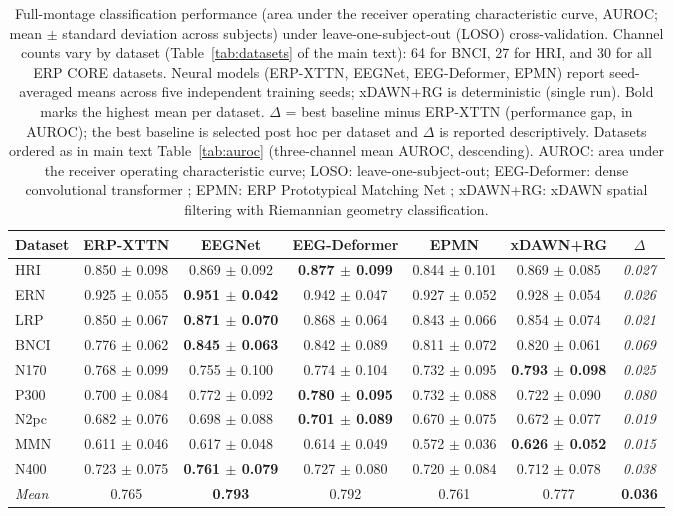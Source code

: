 \begin{table}[t]
\centering
\setlength{\tabcolsep}{5pt}
\caption{%
Full-montage classification performance (area under the receiver operating characteristic curve, AUROC; mean $\pm$ standard deviation across subjects) under leave-one-subject-out (LOSO) cross-validation. Channel counts vary by dataset (Table~\ref{tab:datasets} of the main text): 64 for BNCI, 27 for HRI, and 30 for all ERP CORE datasets. Neural models (ERP-XTTN, EEGNet, EEG-Deformer, EPMN) report seed-averaged means across five independent training seeds; xDAWN+RG is deterministic (single run). Bold marks the highest mean per dataset. $\Delta$ = best baseline minus ERP-XTTN (performance gap, in AUROC); the best baseline is selected post hoc per dataset and $\Delta$ is reported descriptively. Datasets ordered as in main text Table~\ref{tab:auroc} (three-channel mean AUROC, descending). AUROC: area under the receiver operating characteristic curve; LOSO: leave-one-subject-out; EEG-Deformer: dense convolutional transformer \cite{ding2024}; EPMN: ERP Prototypical Matching Net \cite{wei2022}; xDAWN+RG: xDAWN spatial filtering with Riemannian geometry classification.%
}
\label{sup:tab-fullmontage-auroc}
\begin{tabular}{lcccccc}
\toprule
Dataset & ERP-XTTN & EEGNet & EEG-Deformer & EPMN & xDAWN+RG & $\Delta$ \\
\midrule
HRI & 0.850 $\pm$ 0.098 & 0.869 $\pm$ 0.092 & \textbf{0.877 $\pm$ 0.099} & 0.844 $\pm$ 0.101 & 0.869 $\pm$ 0.085 & \textit{0.027} \\
ERN & 0.925 $\pm$ 0.055 & \textbf{0.951 $\pm$ 0.042} & 0.942 $\pm$ 0.047 & 0.927 $\pm$ 0.052 & 0.928 $\pm$ 0.054 & \textit{0.026} \\
LRP & 0.850 $\pm$ 0.067 & \textbf{0.871 $\pm$ 0.070} & 0.868 $\pm$ 0.064 & 0.843 $\pm$ 0.066 & 0.854 $\pm$ 0.074 & \textit{0.021} \\
BNCI & 0.776 $\pm$ 0.062 & \textbf{0.845 $\pm$ 0.063} & 0.842 $\pm$ 0.089 & 0.811 $\pm$ 0.072 & 0.820 $\pm$ 0.061 & \textit{0.069} \\
N170 & 0.768 $\pm$ 0.099 & 0.755 $\pm$ 0.100 & 0.774 $\pm$ 0.104 & 0.732 $\pm$ 0.095 & \textbf{0.793 $\pm$ 0.098} & \textit{0.025} \\
P300 & 0.700 $\pm$ 0.084 & 0.772 $\pm$ 0.092 & \textbf{0.780 $\pm$ 0.095} & 0.732 $\pm$ 0.088 & 0.722 $\pm$ 0.090 & \textit{0.080} \\
N2pc & 0.682 $\pm$ 0.076 & 0.698 $\pm$ 0.088 & \textbf{0.701 $\pm$ 0.089} & 0.670 $\pm$ 0.075 & 0.672 $\pm$ 0.077 & \textit{0.019} \\
MMN & 0.611 $\pm$ 0.046 & 0.617 $\pm$ 0.048 & 0.614 $\pm$ 0.049 & 0.572 $\pm$ 0.036 & \textbf{0.626 $\pm$ 0.052} & \textit{0.015} \\
N400 & 0.723 $\pm$ 0.075 & \textbf{0.761 $\pm$ 0.079} & 0.727 $\pm$ 0.080 & 0.720 $\pm$ 0.084 & 0.712 $\pm$ 0.078 & \textit{0.038} \\
\midrule
\textit{Mean} & 0.765 & \textbf{0.793} & 0.792 & 0.761 & 0.777 & \textbf{0.036} \\
\bottomrule
\end{tabular}
\end{table}
